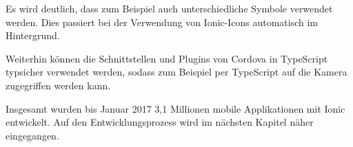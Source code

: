 Es wird deutlich, dass zum Beispiel auch unterschiedliche Symbole verwendet werden. Dies passiert bei der Verwendung von Ionic-Icons automatisch im Hintergrund.

Weiterhin können die Schnittstellen und Plugins von Cordova in TypeScript typsicher verwendet werden, sodass zum Beispiel per TypeScript auf die Kamera zugegriffen werden kann.

Insgesamt wurden bis Januar 2017 3,1 Millionen mobile Applikationen mit Ionic entwickelt. Auf den Entwicklungsprozess wird im nächsten Kapitel näher eingegangen.




